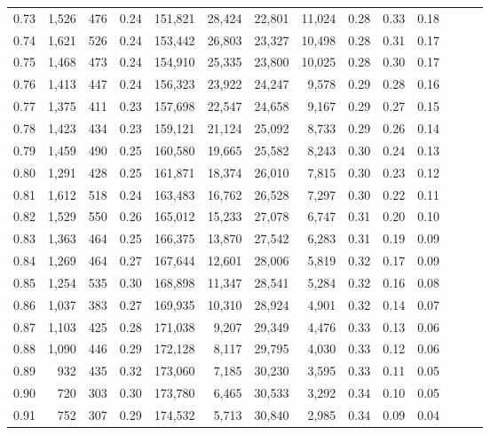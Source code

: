 \begin{tabular}{rrrrrrrrrrrrrr}
0.73 &  1,526 &  476 &  0.24 &  151,821 &   28,424 &  22,801 &  11,024 &  0.28 &  0.33 &      0.18 \\
0.74 &  1,621 &  526 &  0.24 &  153,442 &   26,803 &  23,327 &  10,498 &  0.28 &  0.31 &      0.17 \\
0.75 &  1,468 &  473 &  0.24 &  154,910 &   25,335 &  23,800 &  10,025 &  0.28 &  0.30 &      0.17 \\
0.76 &  1,413 &  447 &  0.24 &  156,323 &   23,922 &  24,247 &   9,578 &  0.29 &  0.28 &      0.16 \\
0.77 &  1,375 &  411 &  0.23 &  157,698 &   22,547 &  24,658 &   9,167 &  0.29 &  0.27 &      0.15 \\
0.78 &  1,423 &  434 &  0.23 &  159,121 &   21,124 &  25,092 &   8,733 &  0.29 &  0.26 &      0.14 \\
0.79 &  1,459 &  490 &  0.25 &  160,580 &   19,665 &  25,582 &   8,243 &  0.30 &  0.24 &      0.13 \\
0.80 &  1,291 &  428 &  0.25 &  161,871 &   18,374 &  26,010 &   7,815 &  0.30 &  0.23 &      0.12 \\
0.81 &  1,612 &  518 &  0.24 &  163,483 &   16,762 &  26,528 &   7,297 &  0.30 &  0.22 &      0.11 \\
0.82 &  1,529 &  550 &  0.26 &  165,012 &   15,233 &  27,078 &   6,747 &  0.31 &  0.20 &      0.10 \\
0.83 &  1,363 &  464 &  0.25 &  166,375 &   13,870 &  27,542 &   6,283 &  0.31 &  0.19 &      0.09 \\
0.84 &  1,269 &  464 &  0.27 &  167,644 &   12,601 &  28,006 &   5,819 &  0.32 &  0.17 &      0.09 \\
0.85 &  1,254 &  535 &  0.30 &  168,898 &   11,347 &  28,541 &   5,284 &  0.32 &  0.16 &      0.08 \\
0.86 &  1,037 &  383 &  0.27 &  169,935 &   10,310 &  28,924 &   4,901 &  0.32 &  0.14 &      0.07 \\
0.87 &  1,103 &  425 &  0.28 &  171,038 &    9,207 &  29,349 &   4,476 &  0.33 &  0.13 &      0.06 \\
0.88 &  1,090 &  446 &  0.29 &  172,128 &    8,117 &  29,795 &   4,030 &  0.33 &  0.12 &      0.06 \\
0.89 &    932 &  435 &  0.32 &  173,060 &    7,185 &  30,230 &   3,595 &  0.33 &  0.11 &      0.05 \\
0.90 &    720 &  303 &  0.30 &  173,780 &    6,465 &  30,533 &   3,292 &  0.34 &  0.10 &      0.05 \\
0.91 &    752 &  307 &  0.29 &  174,532 &    5,713 &  30,840 &   2,985 &  0.34 &  0.09 &      0.04 \\

\end{tabular}

